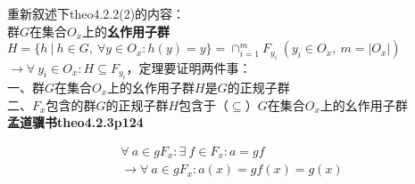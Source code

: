 \noindent 重新叙述下theo4.2.2(2)的内容：\\
群$G$在集合$O_{x}$上的\textbf{幺作用子群}$H=\{h\ |\ h\in G,\ \forall y\in O_{x}:h(y)=y\}=\cap_{i=1}^{m} F_{y_{i}}\ (y_{i}\in O_{x},\ m=|O_{x}|)$
$\rightarrow \forall\ y_{i}\in O_{x}:H\subseteq F_{y_{i}}$，定理要证明两件事：\\
一、群$G$在集合$O_{x}$上的幺作用子群$H$是$G$的正规子群\\
二、$F_{x}$包含的群$G$的正规子群$H$包含于（$\subseteq$）$G$在集合$O_{x}$上的幺作用子群\\

\textbf{孟道骥书\cite{meng2010}theo4.2.3p124}

\begin{gather}
    \forall\ a \in gF_{x}:\exists\ f\in F_{x}:a=gf\\
    \rightarrow \forall\ a \in gF_{x}:a(x)=gf(x)=g(x)
\end{gather}


